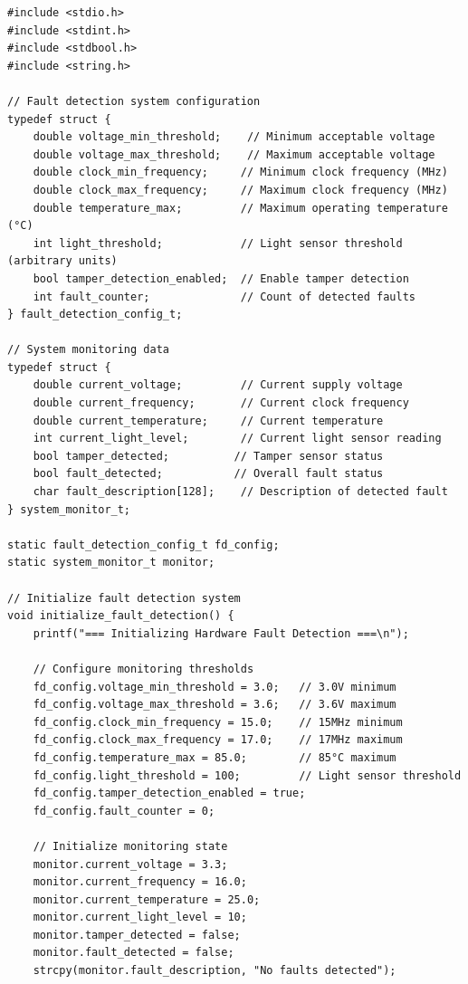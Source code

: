 \documentclass[12pt,a4paper]{article}
\begin{document}
\begin{lstlisting}[caption={Hardware Fault Detection System}]
#include <stdio.h>
#include <stdint.h>
#include <stdbool.h>
#include <string.h>

// Fault detection system configuration
typedef struct {
    double voltage_min_threshold;    // Minimum acceptable voltage
    double voltage_max_threshold;    // Maximum acceptable voltage
    double clock_min_frequency;     // Minimum clock frequency (MHz)
    double clock_max_frequency;     // Maximum clock frequency (MHz)
    double temperature_max;         // Maximum operating temperature (°C)
    int light_threshold;            // Light sensor threshold (arbitrary units)
    bool tamper_detection_enabled;  // Enable tamper detection
    int fault_counter;              // Count of detected faults
} fault_detection_config_t;

// System monitoring data
typedef struct {
    double current_voltage;         // Current supply voltage
    double current_frequency;       // Current clock frequency
    double current_temperature;     // Current temperature
    int current_light_level;        // Current light sensor reading
    bool tamper_detected;          // Tamper sensor status
    bool fault_detected;           // Overall fault status
    char fault_description[128];    // Description of detected fault
} system_monitor_t;

static fault_detection_config_t fd_config;
static system_monitor_t monitor;

// Initialize fault detection system
void initialize_fault_detection() {
    printf("=== Initializing Hardware Fault Detection ===\n");
    
    // Configure monitoring thresholds
    fd_config.voltage_min_threshold = 3.0;   // 3.0V minimum
    fd_config.voltage_max_threshold = 3.6;   // 3.6V maximum
    fd_config.clock_min_frequency = 15.0;    // 15MHz minimum
    fd_config.clock_max_frequency = 17.0;    // 17MHz maximum
    fd_config.temperature_max = 85.0;        // 85°C maximum
    fd_config.light_threshold = 100;         // Light sensor threshold
    fd_config.tamper_detection_enabled = true;
    fd_config.fault_counter = 0;
    
    // Initialize monitoring state
    monitor.current_voltage = 3.3;
    monitor.current_frequency = 16.0;
    monitor.current_temperature = 25.0;
    monitor.current_light_level = 10;
    monitor.tamper_detected = false;
    monitor.fault_detected = false;
    strcpy(monitor.fault_description, "No faults detected");
    

\end{lstlisting}
\end{document}
